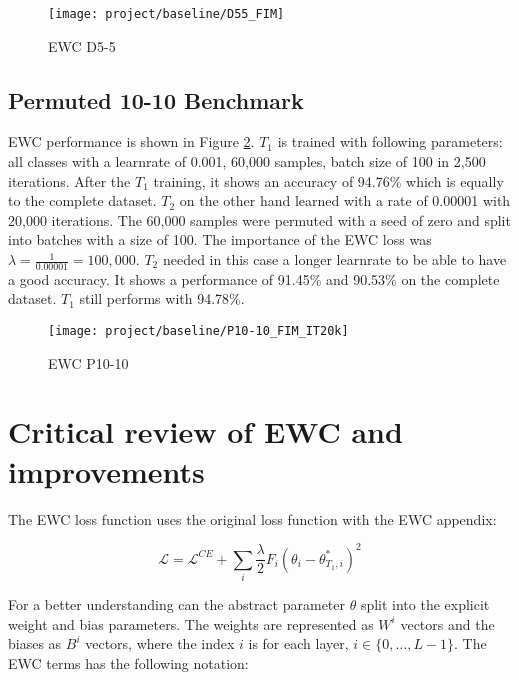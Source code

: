\begin{figure}[H]
    \centering
    \texttt{[image: project/baseline/D55\_FIM]}
    \caption{EWC D5-5}
    \label{fig:ewc_d5-5}
\end{figure}

\subsection{Permuted 10-10 Benchmark}

EWC performance is shown in Figure \ref{fig:ewc_p10-10}.
$T_1$ is trained with following parameters:
all classes with a
learnrate of 0.001,
60,000 samples,
batch size of 100 in
2,500 iterations.
After the $T_1$ training, it shows an accuracy of 94.76\% which is equally to the complete dataset.
\newline
$T_2$ on the other hand learned with a rate of 0.00001 with 20,000 iterations.
The 60,000 samples were permuted with a seed of zero and split into batches with a size of 100.
The importance of the EWC loss was $\lambda = \frac{1}{0.00001} = 100,000$.
$T_2$ needed in this case a longer learnrate to be able to have a good accuracy.
It shows a performance of 91.45\% and 90.53\% on the complete dataset.
$T_1$ still performs with 94.78\%.

\begin{figure}[H]
    \centering
    \texttt{[image: project/baseline/P10-10\_FIM\_IT20k]}
    \caption{EWC P10-10}
    \label{fig:ewc_p10-10}
\end{figure}

\newpage

\section{Critical review of EWC and improvements}
\label{project_review_improvements}

The EWC loss function uses the original loss function with the EWC appendix:

\begin{equation}
    \mathcal{L} = 
    \mathcal{L}^{CE} 
    + \sum_{i} 
        \frac{\lambda}{2} 
        F_{i} 
        (\theta_{i} - \theta_{T_1,i}^{*})^2
\end{equation}

For a better understanding can the abstract parameter $\theta$ split into the explicit weight and bias parameters.
The weights are represented as $W^i$ vectors and the biases as $B^i$ vectors, where the index $i$ is for each layer, $i \in \{ 0, \dots, L-1 \}$.
The EWC terms has the following notation:

